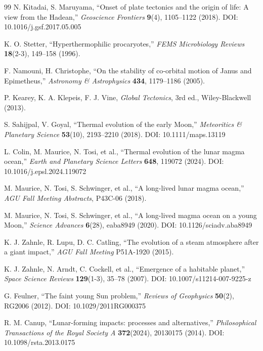 \documentclass[11pt,a4paper]{article}
\begin{document}
\begin{thebibliography}{99}
		N. Kitadai, S. Maruyama, ``Onset of plate tectonics and the origin of life: A view from the Hadean,''
		\emph{Geoscience Frontiers} \textbf{9}(4), 1105–1122 (2018). DOI: 10.1016/j.gsf.2017.05.005
		
		K. O. Stetter, ``Hyperthermophilic procaryotes,''
		\emph{FEMS Microbiology Reviews} \textbf{18}(2-3), 149–158 (1996).
		
		F. Namouni, H. Christophe, ``On the stability of co‑orbital motion of Janus and Epimetheus,''
		\emph{Astronomy \& Astrophysics} \textbf{434}, 1179–1186 (2005).
		
		P. Kearey, K. A. Klepeis, F. J. Vine, \emph{Global Tectonics}, 3rd ed., Wiley-Blackwell (2013).
		
		S. Sahijpal, V. Goyal, ``Thermal evolution of the early Moon,''
		\emph{Meteoritics \& Planetary Science} \textbf{53}(10), 2193–2210 (2018). DOI: 10.1111/maps.13119
		
		L. Colin, M. Maurice, N. Tosi, et al., ``Thermal evolution of the lunar magma ocean,''
		\emph{Earth and Planetary Science Letters} \textbf{648}, 119072 (2024). DOI: 10.1016/j.epsl.2024.119072
		
		M. Maurice, N. Tosi, S. Schwinger, et al., ``A long-lived lunar magma ocean,''
		\emph{AGU Fall Meeting Abstracts}, P43C-06 (2018).
		
		M. Maurice, N. Tosi, S. Schwinger, et al., ``A long-lived magma ocean on a young Moon,''
		\emph{Science Advances} \textbf{6}(28), eaba8949 (2020). DOI: 10.1126/sciadv.aba8949
		
		K. J. Zahnle, R. Lupu, D. C. Catling, ``The evolution of a steam atmosphere after a giant impact,''
		\emph{AGU Fall Meeting} P51A-1920 (2015).
		
		K. J. Zahnle, N. Arndt, C. Cockell, et al., ``Emergence of a habitable planet,''
		\emph{Space Science Reviews} \textbf{129}(1-3), 35–78 (2007). DOI: 10.1007/s11214-007-9225-z
		
		G. Feulner, ``The faint young Sun problem,''
		\emph{Reviews of Geophysics} \textbf{50}(2), RG2006 (2012). DOI: 10.1029/2011RG000375
		
		R. M. Canup, ``Lunar-forming impacts: processes and alternatives,''
		\emph{Philosophical Transactions of the Royal Society A} \textbf{372}(2024), 20130175 (2014). DOI: 10.1098/rsta.2013.0175
		
	\end{thebibliography}
	
\end{document}
